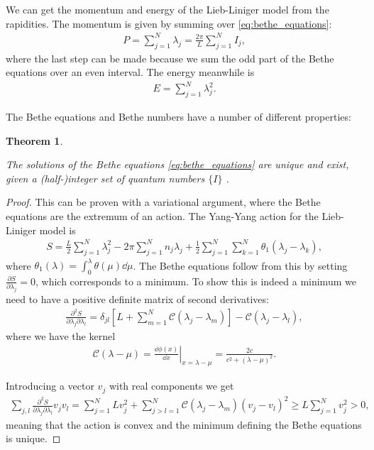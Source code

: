 \documentclass[11pt, a4paper]{report} %
\newtheorem{theorem}{Theorem}
\begin{document}
We can get the momentum and energy of the Lieb-Liniger model from the rapidities. The momentum is given by summing over \cref{eq:bethe_equations}:
\begin{align}
  P = \sum_{j=1}^N \lambda_j = \frac{2\pi}{L}\sum_{j=1}^N I_j,
\end{align}
where the last step can be made because we sum the odd part of the Bethe equations over an even interval.
The energy meanwhile is~\cite{Korepin1993}
\begin{align}
  E = \sum_{j=1}^{N}\lambda_j^2.
\end{align}

The Bethe equations and Bethe numbers have a number of different properties:

\begin{theorem}\label{th:convexity}
\begin{sloppypar}
\noindent
The solutions of the Bethe equations \cref{eq:bethe_equations} are unique and exist, given a \mbox{(half-)integer} set of quantum numbers \(\{I\}\) \textup{\cite{Yang1969}}.
\end{sloppypar}
\end{theorem}
\begin{proof}
This can be proven with a variational argument, where the Bethe equations are the extremum of an action.
The Yang-Yang action for the Lieb-Liniger model is
\begin{align}
	S= \frac{L}{2} \sum_{j=1}^{N} \lambda_j^2 - 2\pi\sum_{j=1}^{N} n_j \lambda_j + \frac{1}{2} \sum_{j=1}^N \sum_{k=1}^{N} \theta_1(\lambda_j - \lambda_k),
\end{align}
where \(\theta_1(\lambda) = \int_0^{\lambda} \theta(\mu)\dd\mu\).
The Bethe equations follow from this by setting \(\frac{\partial S}{\partial \lambda_j} = 0\), which corresponds to a minimum.
To show this is indeed a minimum we need to have a positive definite matrix of second derivatives:
\begin{align}
	\frac{\partial^2S}{\partial\lambda_j\partial\lambda_l} = \delta_{jl} \left[L + \sum_{m=1}^{N} \mathcal{C}(\lambda_j-\lambda_m)\right] - \mathcal{C}(\lambda_j- \lambda_l),
\end{align}
where we have the kernel
\begin{align}
	\mathcal{C}(\lambda - \mu) = \left.\frac{\dd \phi(x)}{\dd x} \right|_{x=\lambda-\mu} = \frac{2c}{c^2 + (\lambda - \mu)^2}.
\end{align}

Introducing a vector \(v_j\) with real components we get~\cite{Korepin1993}
\begin{align}
  	\sum_{j,l}\frac{\partial^2S}{\partial\lambda_j\partial\lambda_l} v_jv_l = \sum_{j=1}^NL v_{j}^2 + \sum_{j>l=1}^{N} \mathcal{C}(\lambda_j-\lambda_m) (v_j - v_l)^2 \geq L \sum_{j=1}^Nv_j^{2} > 0,
\end{align}
meaning that the action is convex and the minimum defining the Bethe equations is unique.
\end{proof}
\end{document}
